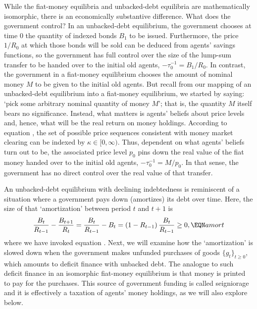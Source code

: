 While the fiat-money equilibria and unbacked-debt 
equilibria are mathematically isomorphic, there is an
economically substantive difference. What does the
government control? In an unbacked-debt equilibrium,
the government chooses at time $0$ the quantity of 
indexed bonds $B_1$ to be issued. Furthermore, the price 
$1/R_0$ at which those bonds will be sold can be deduced
from agents' savings functions, so the government has 
full control over the size 
of the lump-sum transfer to be handed over to the 
initial old agents, $-\tau^{-1}_0 = B_1 / R_0$. 
In contrast, the government in a fiat-money 
equilibrium chooses the amount of nominal money $M$ 
to be given to the initial old agents. 
But recall from our mapping of an unbacked-debt 
equilibrium into a fiat-money equilibrium, we
started by saying: `pick some arbitrary nominal 
quantity of money $M$'; that is, the quantity $M$ itself
bears no significance. Instead, what matters is 
agents' beliefs about price levels and, hence, 
what will be the real return on money holdings.
According to equation , the set of 
possible price sequences consistent with money market 
clearing can be indexed by $\kappa \in [0,\infty)$. 
Thus, dependent on what agents' beliefs turn out to
be, the associated price level $p_0$ pins down the 
real value of the fiat money handed over to the 
initial old agents, $-\tau^{-1}_0 = M / p_0$. 
In that sense, the government has no direct control
over the real value of that transfer.

 


An unbacked-debt equilibrium with declining 
indebtedness is reminiscent of a situation where a
government pays down (amortizes) its debt 
over time. Here, the size of that `amortization' 
between period $t$ and $t+1$ is
$$ {B_t \over R_{t-1}} - {B_{t+1} \over R_t}
= {B_t \over R_{t-1}} - B_t
= (1-R_{t-1})\,{B_t \over R_{t-1}} \geq 0,  \EQN amort
$$
where we have invoked equation .
Next, we will examine how the `amortization' 
is slowed down when the government makes unfunded 
purchases of goods $\{g_t\}_{t\geq 0}$, 
which amounts to deficit finance with unbacked debt. 
The analogue to such deficit finance in an isomorphic 
fiat-money equilibrium is that money is printed to 
pay for the purchases. This source of
government funding is called seigniorage and it is 
effectively a taxation of agents' money holdings,
as we will also explore below.



